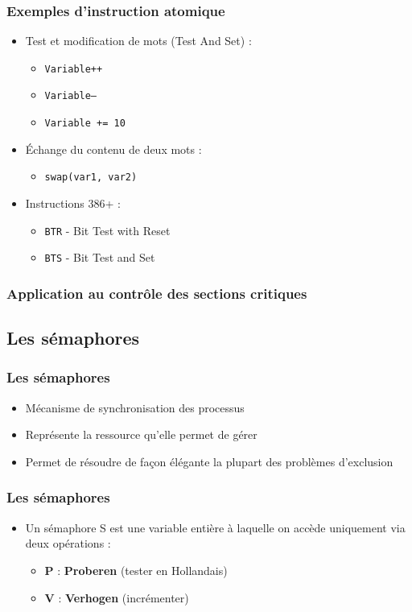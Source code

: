 \begin{frame}
\frametitle{Exemples d’instruction atomique}
\begin{itemize}
\item <1-> Test et modification de mots
(Test And Set) :
\begin{itemize}
\item \texttt{Variable++}
\item \texttt{Variable--}
\item \texttt{Variable += 10}
\end{itemize}
\item <2-> Échange du contenu de deux mots :
\begin{itemize}
\item \texttt{swap(var1, var2)}
\end{itemize}
\item <3-> Instructions 386+ :
\begin{itemize}
\item \texttt{BTR} - Bit Test with Reset
\item \texttt{BTS} - Bit Test and Set
\end{itemize}
\end{itemize}
\end{frame}

\begin{frame}
\frametitle{Application au contrôle des sections critiques}
\begin{scriptsize}\end{scriptsize}
\end{frame}





\subsection{Les sémaphores}

\begin{frame}
\frametitle{Les sémaphores}
\begin{itemize}
\item Mécanisme de synchronisation des processus
\item Représente la ressource qu’elle permet de gérer
\item Permet de résoudre de façon élégante la plupart des problèmes d’exclusion
\end{itemize}
\end{frame}

\begin{frame}
\frametitle{Les sémaphores}
\begin{itemize}
\item Un sémaphore S est une variable entière à laquelle on accède uniquement via deux opérations :
\begin{itemize}
\item \textbf{P} : \textbf{Proberen} (tester en Hollandais)
\item \textbf{V} : \textbf{Verhogen} (incrémenter)
\end{itemize}
\end{itemize}
\end{frame}

